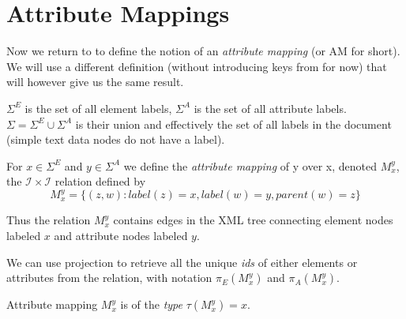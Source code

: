 




\section{Attribute Mappings}

Now we return to \cite{fidax} to define the notion of an \textit{attribute mapping} (or AM for short). 
We will use a different definition (without introducing keys from \cite{keX} for now) that will however give us the same result.

\begin{define}
	$\Sigma^E$ is the set of all element labels, $\Sigma^A$ is the set of all attribute labels. $\Sigma = \Sigma^E \cup \Sigma^A$ is their union and effectively the set of all labels in the document (simple text data nodes do not have a label).
\end{define}

\begin{define}
	For $x \in \Sigma^E$ and $y \in \Sigma^A$ we define the \textit{attribute mapping} of y over x, denoted $M_{x}^{y}$, the $\mathcal{I} \times \mathcal{I}$ relation defined by
	\[M_{x}^{y} = \{ (z,w): label(z) = x, label(w) = y, parent(w) = z \}\]
\end{define}

Thus the relation $M_{x}^{y}$ contains edges in the XML tree connecting element nodes labeled $x$ and attribute nodes labeled $y$.

We can use projection to retrieve all the unique \textit{ids} of either elements or attributes from the relation, with notation $\pi_E(M_{x}^{y})$ and $\pi_A(M_{x}^{y})$.

\begin{define}
	Attribute mapping $M_{x}^{y}$ is of the \textit{type} $\tau(M_{x}^{y}) = x$.
\end{define}

